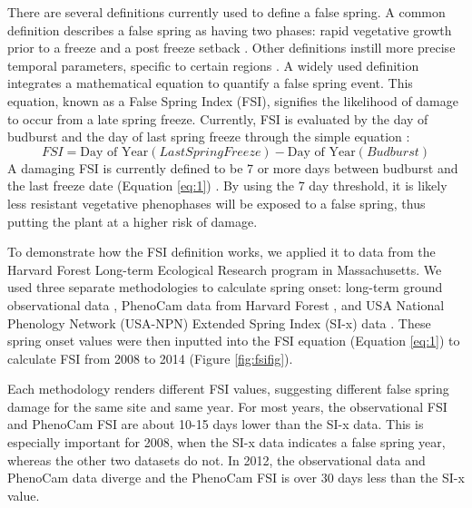 \documentclass{article}\usepackage[]{graphicx}\usepackage[]{color}
\begin{document}
There are several definitions currently used to define a false spring. A common definition describes a false spring as having two phases: rapid vegetative growth prior to a freeze and a post freeze setback \citep{Gu2008}. Other definitions instill more precise temporal parameters, specific to certain regions \citep[e.g., in][false spring for the Midwestern United States is defined as a warmer than average March, a freezing April, and enough growing degree days between budburst and the last freeze date]{Augspurger2013}. A widely used definition integrates a mathematical equation to quantify a false spring event. This equation, known as a False Spring Index (FSI), signifies the likelihood of damage to occur from a late spring freeze. Currently, FSI is evaluated by the day of budburst and the day of last spring freeze through the simple equation \citep{Marino2011}:
\begin{equation} \label{eq:1}
FSI = \text{Day of Year} (Last Spring Freeze) - \text{Day of Year} (Budburst)
\end{equation}
A damaging FSI is currently defined to be 7 or more days between budburst and the last freeze date (Equation \ref{eq:1}) \citep{Peterson2014}. By using the 7 day threshold, it is likely less resistant vegetative phenophases will be exposed to a false spring, thus putting the plant at a higher risk of damage. %

To demonstrate how the FSI definition works, we applied it to data from the Harvard Forest Long-term Ecological Research program in Massachusetts. We used three separate methodologies to calculate spring onset: long-term ground observational data \citep{Okeefe2014}, PhenoCam data from Harvard Forest \citep{Richardson2015}, and USA National Phenology Network (USA-NPN) Extended Spring Index (SI-x) data \citep{USA-NPN2016}. These spring onset values were then inputted into the FSI equation (Equation \ref{eq:1}) to calculate FSI from 2008 to 2014 (Figure \ref{fig:fsifig}). 

Each methodology renders different FSI values, suggesting different false spring damage for the same site and same year. For most years, the observational FSI and PhenoCam FSI are about 10-15 days lower than the SI-x data. This is especially important for 2008, when the SI-x data indicates a false spring year, whereas the other two datasets do not. In 2012, the observational data and PhenoCam data diverge and the PhenoCam FSI is over 30 days less than the SI-x value.
\end{document}
